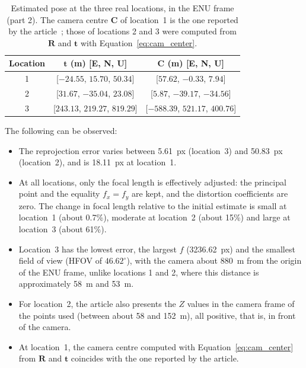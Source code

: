 \begin{table}[htbp]
\centering
\caption{Estimated pose at the three real locations, in the ENU frame (part 2). The camera centre $\mathbf{C}$ of location~1 is the one reported by the article~\cite{sunkara2025}; those of locations 2 and 3 were computed from $\mathbf{R}$ and $\mathbf{t}$ with Equation~\eqref{eq:cam_center}.}
\label{tab:sunkara_reais_pose}
\small
\begin{tabular}{ccc}
\hline
\textbf{Location} & \textbf{$\mathbf{t}$ (m) [E, N, U]} & \textbf{$\mathbf{C}$ (m) [E, N, U]} \\
\hline
1 & [$-24.55$, $15.70$, $50.34$] & [$57.62$, $-0.33$, $7.94$] \\
2 & [$31.67$, $-35.04$, $23.08$] & [$5.87$, $-39.17$, $-34.56$] \\
3 & [$243.13$, $219.27$, $819.29$] & [$-588.39$, $521.17$, $400.76$] \\
\hline
\end{tabular}
\end{table}

The following can be observed:

\begin{itemize}
    \item The reprojection error varies between 5.61~px (location~3) and 50.83~px (location~2), and is 18.11~px at location~1.
    \item At all locations, only the focal length is effectively adjusted: the principal point and the equality $f_x=f_y$ are kept, and the distortion coefficients are zero. The change in focal length relative to the initial estimate is small at location~1 (about 0.7\%), moderate at location~2 (about 15\%) and large at location~3 (about 61\%).
    \item Location~3 has the lowest error, the largest $f$ (3236.62~px) and the smallest field of view (HFOV of $46.62^{\circ}$), with the camera about 880~m from the origin of the ENU frame, unlike locations 1 and 2, where this distance is approximately 58~m and 53~m.
    \item For location~2, the article also presents the $Z$ values in the camera frame of the points used (between about 58 and 152~m), all positive, that is, in front of the camera.
    \item At location~1, the camera centre computed with Equation~\eqref{eq:cam_center} from $\mathbf{R}$ and $\mathbf{t}$ coincides with the one reported by the article.
\end{itemize}


